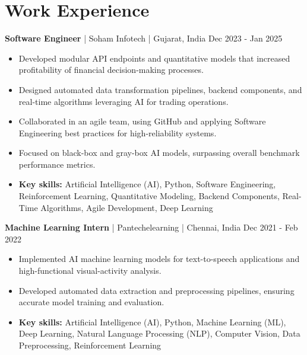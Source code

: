 \documentclass[a4paper,10pt]{article}
\begin{document}
\section*{Work Experience}
\textbf{Software Engineer} | Soham Infotech | Gujarat, India \hfill Dec 2023 - Jan 2025\par
\begin{itemize}
\item Developed modular API endpoints and quantitative models that increased profitability of financial decision-making processes.
\item Designed automated data transformation pipelines, backend components, and real-time algorithms leveraging AI for trading operations.
\item Collaborated in an agile team, using GitHub and applying Software Engineering best practices for high-reliability systems.
\item Focused on black-box and gray-box AI models, surpassing overall benchmark performance metrics.
\item \textbf{Key skills:} Artificial Intelligence (AI), Python, Software Engineering, Reinforcement Learning, Quantitative Modeling, Backend Components, Real-Time Algorithms, Agile Development, Deep Learning
\end{itemize}
\vspace{3pt}
\textbf{Machine Learning Intern} | Pantechelearning | Chennai, India \hfill Dec 2021 - Feb 2022\par
\begin{itemize}
\item Implemented AI machine learning models for text-to-speech applications and high-functional visual-activity analysis.
\item Developed automated data extraction and preprocessing pipelines, ensuring accurate model training and evaluation.
\item \textbf{Key skills:} Artificial Intelligence (AI), Python, Machine Learning (ML), Deep Learning, Natural Language Processing (NLP), Computer Vision, Data Preprocessing, Reinforcement Learning
\end{itemize}
\vspace{3pt}
\end{document}
